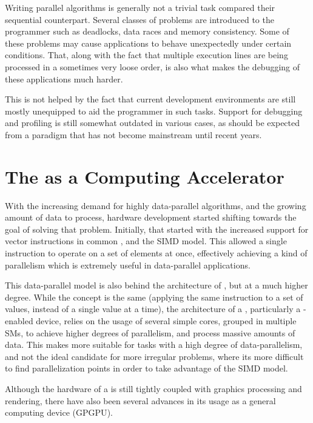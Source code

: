 \documentclass[main.tex]{subfiles}
\begin{document}

Writing parallel algorithms is generally not a trivial task compared their sequential counterpart. Several classes of problems are introduced to the programmer such as deadlocks, data races and memory consistency. Some of these problems may cause applications to behave unexpectedly under certain conditions. That, along with the fact that multiple execution lines are being processed in a sometimes very loose order, is also what makes the debugging of these applications much harder.

This is not helped by the fact that current development environments are still mostly unequipped to aid the programmer in such tasks. Support for debugging and profiling is still somewhat outdated in various cases, as should be expected from a paradigm that has not become mainstream until recent years.


\section{The \gpu as a Computing Accelerator}

With the increasing demand for highly data-parallel algorithms, and the growing amount of data to process, hardware development started shifting towards the goal of solving that problem. Initially, that started with the increased support for vector instructions in common \cpus, and the \acs{SIMD} model. This allowed a single instruction to operate on a set of elements at once, effectively achieving a kind of parallelism which is extremely useful in data-parallel applications.

This data-parallel model is also behind the architecture of \gpus, but at a much higher degree. While the concept is the same (applying the same instruction to a set of values, instead of a single value at a time), the architecture of a \gpu, particularly a \cuda-enabled device, relies on the usage of several simple cores, grouped in multiple \aclp{SM}, to achieve higher degrees of parallelism, and process massive amounts of data. This makes \gpus more suitable for tasks with a high degree of data-parallelism, and not the ideal candidate for more irregular problems, where its more difficult to find parallelization points in order to take advantage of the \acs{SIMD} model.

Although the hardware of a \gpu is still tightly coupled with graphics processing and rendering, there have also been several advances in its usage as a general computing device (\acs{GPGPU}).
\end{document}
